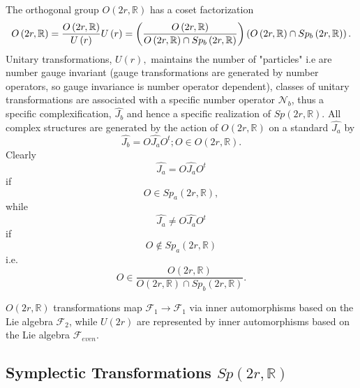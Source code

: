 \documentclass[aps,preprint]{revtex4}
\begin{document}
The orthogonal group $O\left( 2r,\mathbb{R}\right) $ has a coset
factorization 
\begin{equation}
O\left( 2r,\mathbb{R}\right) =\frac{O\left( 2r,\mathbb{R}\right) }{U\left(
r\right) }U\left( r\right) =\left( \frac{O\left( 2r,\mathbb{R}\right) }{%
O\left( 2r,\mathbb{R}\right) \cap Sp_{b}\left( 2r,\mathbb{R}\right) }\right)
\left( O\left( 2r,\mathbb{R}\right) \cap Sp_{b}\left( 2r,\mathbb{R}\right)
\right) .
\end{equation}%
Unitary transformations, $U\left( r\right) ,$ maintains the number of
"particles" i.e are number gauge invariant (gauge transformations are
generated by number operators, so gauge invariance is number operator
dependent), classes of unitary transformations are associated with a
specific number operator $\mathcal{N}_{b}$, thus a specific
complexification, $\widehat{J_{b}}$ and hence a specific realization of $%
Sp\left( 2r,\mathbb{R}\right) .$ All complex structures are generated by the
action of $O\left( 2r,\mathbb{R}\right) $ on a standard $\widehat{J_{a}}$ by 
\begin{equation}
\widehat{J_{b}}=O\widehat{J_{a}}O^{t};O\in O\left( 2r,\mathbb{R}\right) .
\end{equation}%
Clearly 
\begin{equation}
\widehat{J_{a}}=O\widehat{J_{a}}O^{t}
\end{equation}%
if 
\begin{equation}
O\in Sp_{a}\left( 2r,\mathbb{R}\right) ,
\end{equation}%
while 
\begin{equation}
\widehat{J_{a}}\neq O\widehat{J_{a}}O^{t}
\end{equation}%
if 
\begin{equation}
O\notin Sp_{a}\left( 2r,\mathbb{R}\right)
\end{equation}%
i.e. 
\begin{equation}
O\in \frac{O\left( 2r,\mathbb{R}\right) }{O\left( 2r,\mathbb{R}\right) \cap
Sp_{b}\left( 2r,\mathbb{R}\right) }.
\end{equation}

$O\left( 2r,\mathbb{R}\right) $ transformations map $\mathcal{F}%
_{1}\rightarrow\mathcal{F}_{1}$ via inner automorphisms based on the Lie
algebra $\mathcal{F}_{2}$, while $U\left( 2r\right) $ are represented by
inner automorphisms based on the Lie algebra $\mathcal{F}_{even}.$

\subsection{Symplectic Transformations $Sp\left( 2r,\mathbb{R}\right) $}
\end{document}
